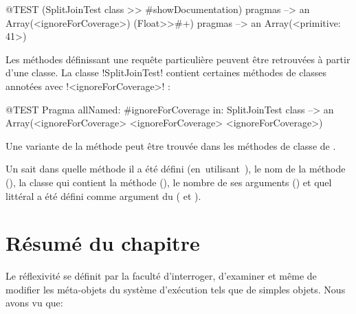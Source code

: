 \documentclass[a4paper,10pt,twoside]{book}
\begin{document}
\begin{code}{@TEST}
(SplitJoinTest class >> #showDocumentation) pragmas
  --> an Array(<ignoreForCoverage>)
(Float>>#+) pragmas --> an Array(<primitive: 41>)
\end{code}

Les méthodes définissant une requête particulière peuvent être retrouvées à partir d'une classe. La classe \ct!SplitJoinTest! contient certaines méthodes de classes annotées avec \ct!<ignoreForCoverage>! :

\begin{code}{@TEST}
Pragma allNamed: #ignoreForCoverage in: SplitJoinTest class  --> an Array(<ignoreForCoverage> <ignoreForCoverage> <ignoreForCoverage>)
\end{code}

Une variante de la méthode  peut être trouvée dans les méthodes de classe de .

Un \pragma sait dans quelle méthode il a été défini \mbox{(en utilisant )}, le nom de la méthode (), la classe qui contient la méthode \mbox{()}, le nombre de ses arguments () et quel littéral a été défini comme argument du \pragma ( et ).


\section{Résumé du chapitre}

Le réflexivité se définit par la faculté d'interroger, d'examiner et même de modifier les méta-objets du système d'exécution tels que de simples objets. Nous avons vu que:
\end{document}
